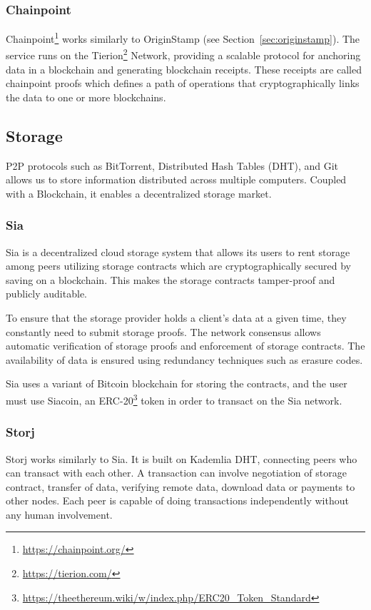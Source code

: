 				\subsubsection{Chainpoint}
				Chainpoint\footnote{\url{https://chainpoint.org/}} works similarly to OriginStamp (see Section~\ref{sec:originstamp}). The service runs on the Tierion\footnote{\url{https://tierion.com/}} Network, providing a scalable protocol for anchoring data in a blockchain and generating blockchain receipts. These receipts are called chainpoint proofs which defines a path of operations that cryptographically links the data to one or more blockchains.
				
		\subsection{Storage}
			P2P protocols such as BitTorrent\cite{cohen2008bittorrent}, Distributed Hash Tables (DHT), and Git allows us to store information distributed across multiple computers. Coupled with a Blockchain, it enables a decentralized storage market.
			
				\subsubsection{Sia}
				Sia\cite{vorick2014sia} is a decentralized cloud storage system that allows its users to rent storage among peers utilizing storage contracts which are cryptographically secured by saving on a blockchain. This makes the storage contracts tamper-proof and publicly auditable.
				
				To ensure that the storage provider holds a client’s data at a given time, they constantly need to submit storage proofs. The network consensus allows automatic verification of storage proofs and enforcement of storage contracts. The availability of data is ensured using redundancy techniques such as erasure codes.
				
				Sia uses a variant of Bitcoin blockchain for storing the contracts, and the user must use Siacoin, an ERC-20\footnote{\url{https://theethereum.wiki/w/index.php/ERC20_Token_Standard}} token in order to transact on the Sia network.
				
				\subsubsection{Storj}
				Storj\cite{wilkinson2014storj} works similarly to Sia. It is built on Kademlia\cite{maymounkov2002kademlia} DHT, connecting peers who can transact with each other. A transaction can involve negotiation of storage contract, transfer of data, verifying remote data, download data or payments to other nodes. Each peer is capable of doing transactions independently without any human involvement.
				
